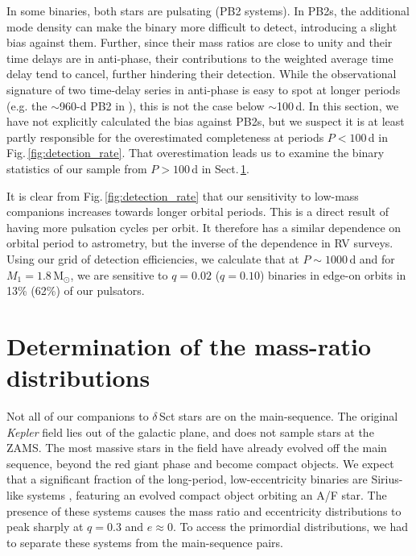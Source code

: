 \documentclass[a4paper,fleqn,usenatbib]{mnras}
\begin{document}
In some binaries, both stars are pulsating (PB2 systems). In PB2s, the additional mode density can make the binary more difficult to detect, introducing a slight bias against them. Further, since their mass ratios are close to unity and their time delays are in anti-phase, their contributions to the weighted average time delay tend to cancel, further hindering their detection. While the observational signature of two time-delay series in anti-phase is easy to spot at longer periods (e.g. the \mbox{$\sim$960-d} PB2 in \citealt{murphyetal2014}), this is not the case below $\sim$100\,d. In this section, we have not explicitly calculated the bias against PB2s, but we suspect it is at least partly responsible for the overestimated completeness at periods $P<100$\,d in Fig.\,\ref{fig:detection_rate}. That overestimation leads us to examine the binary statistics of our sample from $P>100$\,d in Sect.\,\ref{sec:MRD}.

It is clear from Fig.\,\ref{fig:detection_rate} that our sensitivity to low-mass companions increases towards longer orbital periods. This is a direct result of having more pulsation cycles per orbit. It therefore has a similar dependence on orbital period to astrometry, but the inverse of the dependence in RV surveys. 
Using our grid of detection efficiencies, we calculate that at $P \sim 1000$\,d and for $M_1 = 1.8$\,M$_{\odot}$, we are sensitive to $q = 0.02$ ($q=0.10$) binaries in edge-on orbits in 13\% (62\%) of our pulsators.



\section{Determination of the mass-ratio distributions}
\label{sec:MRD}

Not all of our companions to $\delta$\,Sct stars are on the main-sequence. The original \textit{Kepler} field lies out of the galactic plane, and does not sample stars at the ZAMS. The most massive stars in the field have already evolved off the main sequence, beyond the red giant phase and become compact objects. We expect that a significant fraction of the long-period, low-eccentricity binaries are Sirius-like systems \citep{holbergetal2013}, featuring an evolved compact object orbiting an A/F star. The presence of these systems causes the mass ratio and eccentricity distributions to peak sharply at $q=0.3$ and $e\approx0$. To access the primordial distributions, we had to separate these systems from the main-sequence pairs.
\end{document}
